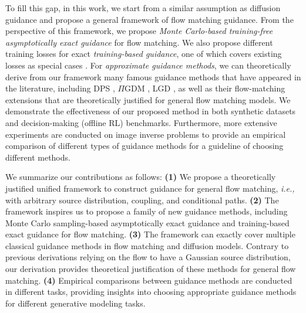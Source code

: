 To fill this gap, in this work, we start from a similar assumption as diffusion guidance and propose a general framework of flow matching guidance. From the perspective of this framework, we propose \emph{Monte Carlo-based training-free asymptotically exact guidance} for flow matching. We also propose different training losses for exact \emph{training-based guidance}, one of which covers existing losses as special cases \citep{lu_contrastive_nodate,anonymous2025energyweighted}. For \emph{approximate guidance methods}, we can theoretically derive from our framework many famous guidance methods that have appeared in the literature, including DPS \cite{chung_diffusion_2024}, $\Pi$GDM \cite{song_pseudoinverse-guided_2022}, LGD \citep{song_loss-guided_2023}, as well as their flow-matching extensions that are theoretically justified for general flow matching models. We demonstrate the effectiveness of our proposed method in both synthetic datasets and decision-making (offline RL) benchmarks. Furthermore, more extensive experiments are conducted on image inverse problems to provide an empirical comparison of different types of guidance methods for a guideline of choosing different methods.


We summarize our contributions as follows:
\textbf{(1)} We propose a theoretically justified unified framework to construct guidance for general flow matching, \emph{i.e.,} with arbitrary source distribution, coupling, and conditional paths.
\textbf{(2)} The framework inspires us to propose a family of new guidance methods, including Monte Carlo sampling-based asymptotically exact guidance and training-based exact guidance for flow matching.
\textbf{(3)} The framework can exactly cover multiple classical guidance methods in flow matching and diffusion models. Contrary to previous derivations relying on the flow to have a Gaussian source distribution, our derivation provides theoretical justification of these methods for general flow matching.
\textbf{(4)} Empirical comparisons between guidance methods are conducted in different tasks, providing insights into choosing appropriate guidance methods for different generative modeling tasks.
